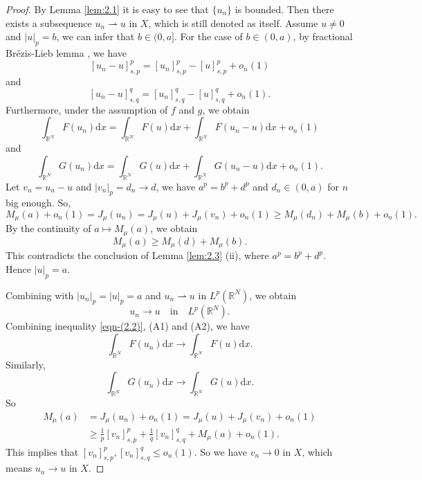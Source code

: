 \documentclass[10pt,a4paper]{amsart}
\numberwithin{equation}{section}
\begin{document}
\begin{proof}
By Lemma \ref{lem:2.1} it is easy to see that $\{u_n\}$ is bounded. 
Then there exists a subsequence $u_n\rightharpoonup u$ in $X$, which is still 
denoted as itself.
Assume $u\neq 0$ and $|u|_p=b$,
we can infer that $b\in(0,a]$. For the case of $b\in(0,a)$,
by fractional Br\'{e}zis-Lieb lemma \cite{ref1}, we have
$$
[u_n-u]_{s,p}^{p}=[u_n]_{s,p}^{p}-[u]_{s,p}^{p}+o_n(1)
$$
and
$$
[u_n-u]_{s,q}^{q}=[u_n]_{s,q}^{q}-[u]_{s,q}^{q}+o_n(1).
$$
Furthermore, under the assumption of $f$ and $g$, we obtain
$$
\int_{\mathbb{R}^N}F(u_n)\mathrm{d}x
=\int_{\mathbb{R}^N}F(u)\mathrm{d}x+\int_{\mathbb{R}^N}F(u_n-u)\mathrm{d}x+o_n(1)
$$
and
$$
\int_{\mathbb{R}^N}G(u_n)\mathrm{d}x=\int_{\mathbb{R}^N}G(u)\mathrm{d}x
+\int_{\mathbb{R}^N}G(u_n-u)\mathrm{d}x+o_n(1).
$$
Let $v_n=u_n-u$ and $|v_n|_p=d_n\to d$, we have $a^{p}=b^{p}+d^{p}$ and 
$d_n\in(0,a)$ for $n$ big enough. So,
$$
M_\mu(a)+o_n(1)=J_\mu(u_n)=J_\mu(u)+J_\mu(v_n)+o_n(1)\ge M_\mu(d_n)+M_\mu(b)+o_n(1).
$$
By the continuity of $a\mapsto M_\mu (a)$, we obtain
$$
M_\mu(a)\ge M_\mu(d)+M_\mu(b).
$$
This contradicts the conclusion of Lemma \ref{lem:2.3} (ii),
 where $a^{p}=b^{p}+d^{p}$.
Hence $|u|_p=a$.

Combining with $|u_n|_p=|u|_p=a$ and $u_n\rightharpoonup u$ in $L^{p}(\mathbb{R}^N)$, 
we obtain
\begin{equation}\label{eqn-(2.8)}
u_n\to u \quad \text{in} \quad L^{p}(\mathbb{R}^N).
\end{equation}
Combining inequality \eqref{eqn-(2.2)}, (A1) and (A2), we have
\begin{equation}\label{eqn-(2.9)}
\int_{\mathbb{R}^N}F(u_n)\mathrm{d}x\to\int_{\mathbb{R}^N}F(u)\mathrm{d}x.
\end{equation}
Similarly,
\begin{equation}\label{eqn-(2.10)}
\int_{\mathbb{R}^N}G(u_n)\mathrm{d}x\to\int_{\mathbb{R}^N}G(u)\mathrm{d}x.
\end{equation}
So
\begin{align*}
M_\mu(a)
&=J_\mu(u_n)+o_n(1)=J_\mu(u)+J_\mu(v_n)+o_n(1)\\
&\ge\frac{1}{p}[v_n]_{s,p}^{p}+\frac{1}{q}[v_n]_{s,q}^{q}+M_\mu(a)+o_n(1).
\end{align*}
This implies that $[v_n]_{s,p}^{p},[v_n]_{s,q}^{q}\le o_n(1)$.
So we have $v_n\to 0$ in $X$, which means $u_n\to u$ in $X$.


\end{proof}
\end{document}
